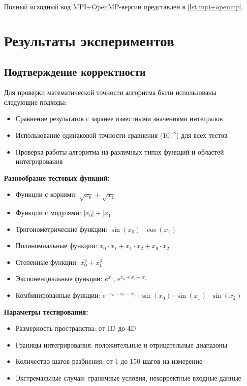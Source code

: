 \documentclass[a4paper,12pt]{article}
\begin{document}
  Полный исходный код MPI+OpenMP-версии представлен в \autoref{lst:mpi+openmp}.

  \newpage


  \section{Результаты экспериментов}\label{sec:results}

  \subsection{Подтверждение корректности}\label{subsec:correctness}

  Для проверки математической точности алгоритма были использованы следующие подходы:

  \begin{itemize}
    \item Сравнение результатов с заранее известными значениями интегралов
    \item Использование одинаковой точности сравнения ($10^{-8}$) для всех тестов
    \item Проверка работы алгоритма на различных типах функций и областей интегрирования
  \end{itemize}

  \textbf{Разнообразие тестовых функций:}
  \begin{itemize}
    \item Функции с корнями: $\sqrt{x_0} + \sqrt{x_1}$
    \item Функции с модулями: $|x_0| + |x_1|$
    \item Тригонометрические функции: $\sin(x_0) \cdot \cos(x_1)$
    \item Полиномиальные функции: $x_0 \cdot x_1 + x_1 \cdot x_2 + x_0 \cdot x_2$
    \item Степенные функции: $x_0^3 + x_1^3$
    \item Экспоненциальные функции: $e^{x_0}$, $e^{x_0 + x_1 + x_2}$
    \item Комбинированные функции: $e^{-x_0 - x_1 - x_2} \cdot \sin(x_0) \cdot \sin(x_1) \cdot \sin(x_2)$
  \end{itemize}

  \textbf{Параметры тестирования:}
  \begin{itemize}
    \item Размерность пространства: от 1D до 4D
    \item Границы интегрирования: положительные и отрицательные диапазоны
    \item Количество шагов разбиения: от 1 до 150 шагов на измерение
    \item Экстремальные случаи: граничные условия, некорректные входные данные
  \end{itemize}
\end{document}
